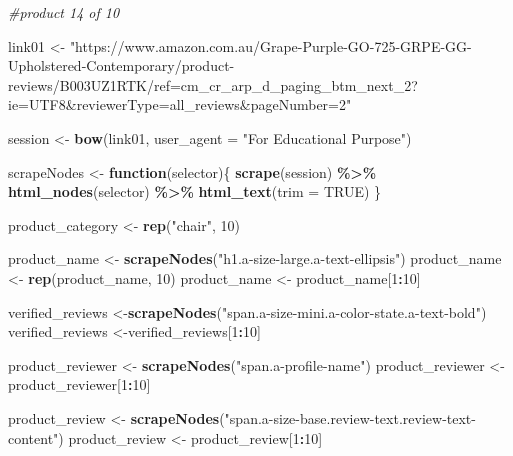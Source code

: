 \documentclass[
]{article}
\newenvironment{Shaded}{\begin{snugshade}}{\end{snugshade}}
\newcommand{\AttributeTok}[1]{\textcolor[rgb]{0.13,0.29,0.53}{#1}}
\newcommand{\CommentTok}[1]{\textcolor[rgb]{0.56,0.35,0.01}{\textit{#1}}}
\newcommand{\ConstantTok}[1]{\textcolor[rgb]{0.56,0.35,0.01}{#1}}
\newcommand{\ControlFlowTok}[1]{\textcolor[rgb]{0.13,0.29,0.53}{\textbf{#1}}}
\newcommand{\DecValTok}[1]{\textcolor[rgb]{0.00,0.00,0.81}{#1}}
\newcommand{\FunctionTok}[1]{\textcolor[rgb]{0.13,0.29,0.53}{\textbf{#1}}}
\newcommand{\NormalTok}[1]{#1}
\newcommand{\OtherTok}[1]{\textcolor[rgb]{0.56,0.35,0.01}{#1}}
\newcommand{\SpecialCharTok}[1]{\textcolor[rgb]{0.81,0.36,0.00}{\textbf{#1}}}
\newcommand{\StringTok}[1]{\textcolor[rgb]{0.31,0.60,0.02}{#1}}
\begin{document}
\begin{Shaded}
\begin{Highlighting}[]
\CommentTok{\#product 14 of 10}

\NormalTok{link01 }\OtherTok{\textless{}{-}} \StringTok{"https://www.amazon.com.au/Grape{-}Purple{-}GO{-}725{-}GRPE{-}GG{-}Upholstered{-}Contemporary/product{-}reviews/B003UZ1RTK/ref=cm\_cr\_arp\_d\_paging\_btm\_next\_2?ie=UTF8\&reviewerType=all\_reviews\&pageNumber=2"}


\NormalTok{  session }\OtherTok{\textless{}{-}} \FunctionTok{bow}\NormalTok{(link01,}
               \AttributeTok{user\_agent =} \StringTok{"For Educational Purpose"}\NormalTok{)}

\NormalTok{  scrapeNodes }\OtherTok{\textless{}{-}} \ControlFlowTok{function}\NormalTok{(selector)\{}
    \FunctionTok{scrape}\NormalTok{(session) }\SpecialCharTok{\%\textgreater{}\%}
      \FunctionTok{html\_nodes}\NormalTok{(selector) }\SpecialCharTok{\%\textgreater{}\%}
      \FunctionTok{html\_text}\NormalTok{(}\AttributeTok{trim =} \ConstantTok{TRUE}\NormalTok{)}
\NormalTok{  \}}

\NormalTok{  product\_category }\OtherTok{\textless{}{-}} \FunctionTok{rep}\NormalTok{(}\StringTok{"chair"}\NormalTok{, }\DecValTok{10}\NormalTok{)}

\NormalTok{  product\_name }\OtherTok{\textless{}{-}} \FunctionTok{scrapeNodes}\NormalTok{(}\StringTok{"h1.a{-}size{-}large.a{-}text{-}ellipsis"}\NormalTok{)}
\NormalTok{  product\_name }\OtherTok{\textless{}{-}} \FunctionTok{rep}\NormalTok{(product\_name, }\DecValTok{10}\NormalTok{)}
\NormalTok{  product\_name }\OtherTok{\textless{}{-}}\NormalTok{ product\_name[}\DecValTok{1}\SpecialCharTok{:}\DecValTok{10}\NormalTok{]}
  
\NormalTok{  verified\_reviews }\OtherTok{\textless{}{-}}\FunctionTok{scrapeNodes}\NormalTok{(}\StringTok{"span.a{-}size{-}mini.a{-}color{-}state.a{-}text{-}bold"}\NormalTok{)}
\NormalTok{  verified\_reviews }\OtherTok{\textless{}{-}}\NormalTok{verified\_reviews[}\DecValTok{1}\SpecialCharTok{:}\DecValTok{10}\NormalTok{]}
  
\NormalTok{  product\_reviewer }\OtherTok{\textless{}{-}} \FunctionTok{scrapeNodes}\NormalTok{(}\StringTok{"span.a{-}profile{-}name"}\NormalTok{)}
\NormalTok{  product\_reviewer }\OtherTok{\textless{}{-}}\NormalTok{ product\_reviewer[}\DecValTok{1}\SpecialCharTok{:}\DecValTok{10}\NormalTok{]}
  
\NormalTok{  product\_review }\OtherTok{\textless{}{-}} \FunctionTok{scrapeNodes}\NormalTok{(}\StringTok{"span.a{-}size{-}base.review{-}text.review{-}text{-}content"}\NormalTok{)}
\NormalTok{  product\_review }\OtherTok{\textless{}{-}}\NormalTok{ product\_review[}\DecValTok{1}\SpecialCharTok{:}\DecValTok{10}\NormalTok{]}
  

\end{Highlighting}
\end{Shaded}
\end{document}
